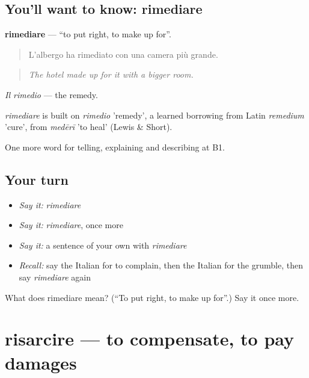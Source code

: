\subsection*{You'll want to know: rimediare}
\textbf{rimediare} — \textquotedblleft{}to put right, to make up for\textquotedblright{}.

\begin{quote}
L'albergo ha rimediato con una camera più grande.
\end{quote}

\begin{quote}
\emph{The hotel made up for it with a bigger room.}
\end{quote}

\emph{Il rimedio} — the remedy.

\begin{cousinweb}
\emph{rimediare} is built on \emph{rimedio} 'remedy', a learned borrowing from Latin \emph{remedium} 'cure', from \emph{medērī} 'to heal' (Lewis \& Short).
\end{cousinweb}

\begin{grammarlens}[title={What you've built}]
One more word for telling, explaining and describing at B1.
\end{grammarlens}

\subsection*{Your turn}
\begin{itemize}
\raggedright
  \item \emph{Say it:} \emph{rimediare}
  \item \emph{Say it:} \emph{rimediare}, once more
  \item \emph{Say it:} a sentence of your own with \emph{rimediare}
  \item \emph{Recall:} say the Italian for to complain, then the Italian for the grumble, then say \emph{rimediare} again
\end{itemize}

\begin{tcolorbox}[breakable,colback=teal!4,colframe=teal!35!black,title={Before you move on}]
What does rimediare mean? (\textquotedblleft{}To put right, to make up for\textquotedblright{}.) Say it once more.
\end{tcolorbox}
\section[risarcire]{risarcire — to compensate, to pay damages}

